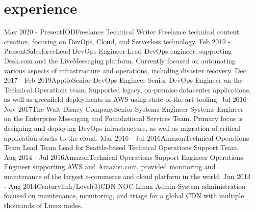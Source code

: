 \documentclass[]{mv_cv}
\begin{document}
\section{experience}
  \begin{explist}
    \expitem
    {May 2020 - Present}{IOD}{Freelance Technical Writer}
    {Freelance technical content creation, focusing on DevOps, Cloud, and Serverless technology.}
    \expitem
    {Feb 2019 - Present}{Salesforce}{Lead DevOps Engineer}
    {Lead DevOps engineer, supporting Desk.com and the LiveMessaging platform. Currently focused on automating various aspects of infrastructure and operations, including disaster recovery.}
    \expitem
    {Dec 2017 - Feb 2019}{Apptio}{Senior DevOps Engineer}
    {Senior DevOps Engineer on the Technical Operations team. Supported legacy, on-premise datacenter applications, as well as greenfield deployments in AWS using state-of-the-art tooling.}
    \expitem
    {Jul 2016 - Nov 2017}{The Walt Disney Company}{Senior Systems Engineer}
    {Systems Engineer on the Enterprise Messaging and Foundational Services Team. Primary focus is designing and deploying DevOps infrastructure, as well as migration of critical application stacks to the cloud.}
    \expitem
    {Mar 2016 - Jul 2016}{Amazon}{Technical Operations Team Lead}
    {Team Lead for Seattle-based Technical Operations Support Team.}
    \expitem
    {Aug 2014 - Jul 2016}{Amazon}{Technical Operations Support Engineer}
    {Operations Engineer supporting AWS and Amazon.com, provided monitoring and maintenance of the largest e-commerce and cloud platform in the world.}
   \expitem
    {Jun 2013 - Aug 2014}{Centurylink/Level(3)}{CDN NOC Linux Admin}
    {System administration focused on maintenance, monitoring, and triage for a global CDN with multiple thousands of Linux nodes.}
  \end{explist}

\thispagestyle{empty}
\end{document}
